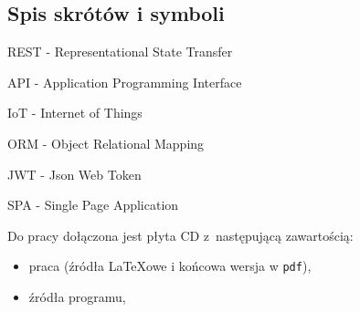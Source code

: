 \documentclass[a4paper,12pt]{book}
\begin{document}
 


\begin{appendices}
 
  \chapter*{Spis skrótów i symboli}
  
  \begin{description}
    \item REST - Representational State Transfer
    \item API - Application Programming Interface
    \item IoT - Internet of Things
    \item ORM - Object Relational Mapping
    \item JWT - Json Web Token
    \item SPA - Single Page Application
  \end{description}

Do pracy dołączona jest płyta CD z~następującą zawartością:

\begin{itemize}
  \item praca (źródła \LaTeX owe i końcowa wersja w \texttt{pdf}),
  \item źródła programu,
\end{itemize}

\listoffigures

\end{appendices}
\end{document}
